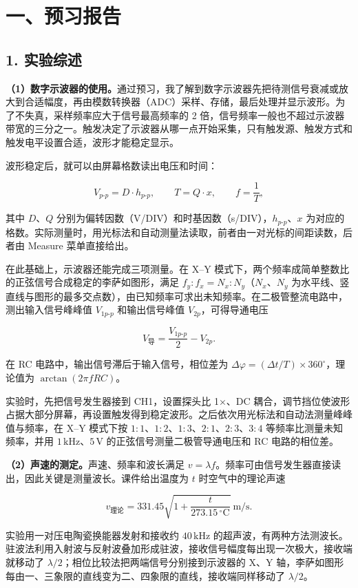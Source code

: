 \section*{一、预习报告}

\subsection*{1. 实验综述}

\textbf{（1）数字示波器的使用。}通过预习，我了解到数字示波器先把待测信号衰减或放大到合适幅度，再由模数转换器（ADC）采样、存储，最后处理并显示波形。为了不失真，采样频率应大于信号最高频率的 2 倍，信号频率一般也不超过示波器带宽的三分之一。触发决定了示波器从哪一点开始采集，只有触发源、触发方式和触发电平设置合适，波形才能稳定显示。

波形稳定后，就可以由屏幕格数读出电压和时间：

\[
V_{p\text{-}p}=D\cdot h_{p\text{-}p},\qquad T=Q\cdot x,\qquad f=\frac1T,
\]

其中 $D$、$Q$ 分别为偏转因数（V/DIV）和时基因数（s/DIV），$h_{p\text{-}p}$、$x$ 为对应的格数。实际测量时，用光标法和自动测量法读取，前者由一对光标的间距读数，后者由 Measure 菜单直接给出。

在此基础上，示波器还能完成三项测量。在 X--Y 模式下，两个频率成简单整数比的正弦信号合成稳定的李萨如图形，满足 $f_y:f_x=N_x:N_y$（$N_x$、$N_y$ 为水平线、竖直线与图形的最多交点数），由已知频率可求出未知频率。在二极管整流电路中，测出输入信号峰峰值 $V_{1p\text{-}p}$ 和输出信号峰值 $V_{2p}$，可得导通电压

\[
V_{\text{导}}=\frac{V_{1p\text{-}p}}{2}-V_{2p}.
\]

在 RC 电路中，输出信号滞后于输入信号，相位差为 $\Delta\varphi=(\Delta t/T)\times360^\circ$，理论值为 $\arctan(2\pi fRC)$。

实验时，先把信号发生器接到 CH1，设置探头比 1×、DC 耦合，调节挡位使波形占据大部分屏幕，再设置触发得到稳定波形。之后依次用光标法和自动法测量峰峰值与频率，在 X--Y 模式下按 $1:1$、$1:2$、$1:3$、$2:1$、$2:3$、$3:4$ 等频率比测量未知频率，并用 $1\,\mathrm{kHz}$、$5\,\mathrm{V}$ 的正弦信号测量二极管导通电压和 RC 电路的相位差。

\textbf{（2）声速的测定。}声速、频率和波长满足 $v=\lambda f$。频率可由信号发生器直接读出，因此关键是测量波长。课件给出温度为 $t$ 时空气中的理论声速

\[
v_{\text{理论}}=331.45\sqrt{1+\frac{t}{273.15\,{}^\circ\mathrm{C}}}\ \mathrm{m/s}.
\]

实验用一对压电陶瓷换能器发射和接收约 $40\,\mathrm{kHz}$ 的超声波，有两种方法测波长。驻波法利用入射波与反射波叠加形成驻波，接收信号幅度每出现一次极大，接收端就移动了 $\lambda/2$；相位比较法把两端信号分别接到示波器的 X、Y 轴，李萨如图形每由一、三象限的直线变为二、四象限的直线，接收端同样移动了 $\lambda/2$。

